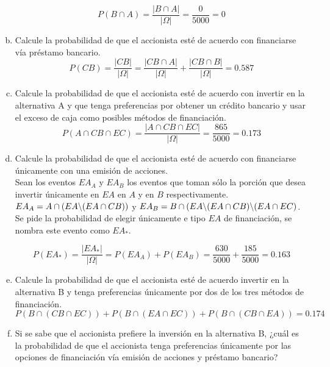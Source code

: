 \documentclass[11pt, spanish]{article}
\begin{document}
\begin{enumerate}[(a)]
$$P(B \cap A) = \frac{\left| B \cap A \right|}{\left| \Omega \right|} = \frac{0}{5000} = 0$$

\item Calcule la probabilidad de que el accionista esté de acuerdo con financiarse vía préstamo bancario.\\

$$P(CB) = \frac{\left| CB \right|}{\left| \Omega \right|} =  \frac{\left| CB \cap A \right|}{\left| \Omega \right|} + \frac{\left| CB \cap B \right|}{\left| \Omega \right|} = 0.587$$

\item Calcule la probabilidad de que el accionista esté de acuerdo con invertir en la alternativa A y que tenga preferencias por obtener un crédito bancario y usar el exceso de caja como posibles métodos de financiación.\\

$$P(A \cap CB \cap EC) = \frac{\left| A \cap CB \cap EC \right|}{\left| \Omega \right|} = \frac{865}{5000} = 0.173$$

\item Calcule la probabilidad de que el accionista esté de acuerdo con financiarse únicamente con una emisión de acciones.\\

Sean los eventos $EA_{A}$ y $EA_{B}$ los eventos que toman sólo la porción que desea invertir únicamente en $EA$ en $A$ y en $B$ respectivamente. $EA_{A} = A \cap (EA \char`\\ (EA \cap CB))$ y $EA_{B} = B \cap (EA \char`\\ (EA \cap CB) \char`\\ (EA \cap EC)$. Se pide la probabilidad de elegir únicamente e tipo $EA$ de financiación, se nombra este evento como $EA_{*}$.

$$P(EA_{*}) = \frac{\left| EA_{*} \right|}{\left| \Omega \right|} = P(EA_{A}) + P(EA_{B}) = \frac{630}{5000} + \frac{185}{5000} =  0.163$$

\item Calcule la probabilidad de que el accionista esté de acuerdo invertir en la alternativa B y tenga preferencias únicamente por dos de los tres métodos de financiación.
$$P(B \cap (CB \cap EC)) + P(B \cap (EA \cap EC)) + P(B \cap (CB \cap EA)) = 0.174$$

\item Si se sabe que el accionista prefiere la inversión en la alternativa B, ¿cuál es la probabilidad de que el accionista tenga preferencias únicamente por las opciones de financiación vía emisión de acciones y préstamo bancario?\\


\end{enumerate}
\end{document}
